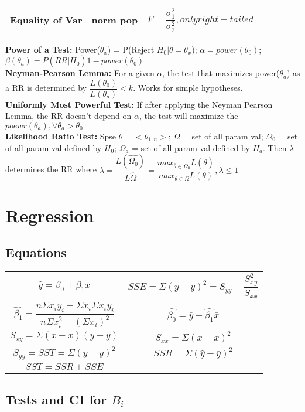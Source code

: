 \documentclass{article}
\begin{document}
\begin{multicols}{2}
\begin{tabular}{|c|c|c|}
Equality of Var & norm pop & $F = \dfrac{\sigma_1^2}{\sigma_2^2}, only right-tailed$ \\ \hline
\end{tabular}
\textbf{Power of a Test:} Power($\theta_x$) = P(Reject $H_0|\theta=\theta_x$); $\alpha = power(\theta_0)$; $\beta(\theta_a) = P(\bar{RR}|\bar{H_0})1-power(\theta_0)$\\
\textbf{Neyman-Pearson Lemma:} For a given $\alpha$, the test that maximizes power($\theta_a$) as a RR is determined by $\dfrac{L(\theta_0)}{L(\theta_a)}<k.$ Works for simple hypotheses.\\
\textbf{Uniformly Most Powerful Test:} If after applying the Neyman Pearson Lemma, the RR doesn't depend on $\alpha$, the test will maximize the $poewr(\theta_a), \forall\theta_a>\theta_0$\\
\textbf{Likelihood Ratio Test:} Spse $\bar{\theta} = <\theta_{1:n}>$; $\Omega$ = set of all param val; $\Omega_0$ = set of all param val defined by $H_0$; $\Omega_a$ = set of all param val defined by $H_a$. Then $\lambda$ determines the RR where $\lambda = \dfrac{L(\hat{\Omega_0})}{L\hat{\Omega}} = \dfrac{max_{\bar{\theta}\in\Omega_0}L(\bar{\theta})}{max_{\theta\in\Omega}L(\theta)}, \lambda \leq 1$\\

\section{Regression}
\subsection{Equations}
\begin{tabular}{c c}
$\hat{y} = \beta_0 + \beta_1 x$ & $SSE = \Sigma (y - \bar{y})^2 = S_{yy} - \dfrac{S_{xy}^2}{S_{xx}}$\\
$\hat{\beta_1} = \dfrac{n\Sigma x_iy_i - \Sigma x_i \Sigma x_iy_i}{n\Sigma x_i^2 - (\Sigma x_i)^2}$ &
$\hat{\beta_0} = \bar{y}-\hat{\beta_1}\bar{x}$\\
$S_{xy} = \Sigma (x-\bar{x})(y-\bar{y})$ &
$S_{xx} = \Sigma (x-\bar{x})^2$\\
$S_{yy} = SST = \Sigma (y-\bar{y})^2$ &
$SSR = \Sigma (\hat{y} - \bar{y})^2$\\
$SST = SSR + SSE$\\
\end{tabular}

\subsection{Tests and CI for $B_i$}

\end{multicols}
\end{document}
